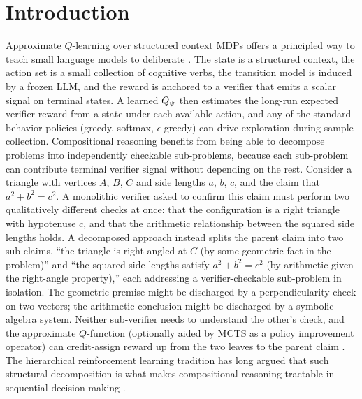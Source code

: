 \section{Introduction}
\label{sec:introduction}


Approximate $Q$-learning over structured context MDPs offers a principled
way to teach small language models to deliberate
\citep{sutton2018reinforcement, mnih2015human}. The state is a
structured context, the action set is a small collection of cognitive
verbs, the transition model is induced by a frozen LLM, and the reward
is anchored to a verifier that emits a scalar signal on terminal states.
A learned $Q_{\psi}$ then estimates the long-run expected verifier reward
from a state under each available action, and any of the standard
behavior policies (greedy, softmax, $\epsilon$-greedy) can drive
exploration during sample collection. Compositional reasoning benefits
from being able to decompose problems into independently checkable
sub-problems, because each sub-problem can contribute terminal verifier
signal without depending on the rest. Consider a triangle with vertices
$A$, $B$, $C$ and side lengths $a$, $b$, $c$, and the claim that
$a^2 + b^2 = c^2$. A monolithic verifier asked to confirm this claim
must perform two qualitatively different checks at once: that the
configuration is a right triangle with hypotenuse $c$, and that the
arithmetic relationship between the squared side lengths holds. A
decomposed approach instead splits the parent claim into two
sub-claims, ``the triangle is right-angled at $C$ (by some geometric
fact in the problem)'' and ``the squared side lengths satisfy
$a^2 + b^2 = c^2$ (by arithmetic given the right-angle property),''
each addressing a verifier-checkable sub-problem in isolation. The
geometric premise might be discharged by a perpendicularity check on
two vectors; the arithmetic conclusion might be discharged by a
symbolic algebra system. Neither sub-verifier needs to understand the
other's check, and the approximate $Q$-function (optionally aided by
MCTS as a policy improvement operator) can credit-assign reward up
from the two leaves to the parent claim
\citep{kocsis2006bandit, coulom2006efficient, anthony2017thinking}.
The hierarchical reinforcement learning tradition has long argued that
such structural decomposition is what makes compositional reasoning
tractable in sequential decision-making
\citep{sutton1999between, dietterich2000hierarchical,
vezhnevets2017feudal}.

